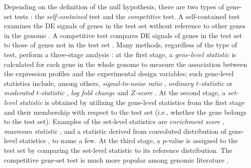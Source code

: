 	Depending on the definition of the null hypothesis, there are two types of gene-set tests
	\citep{goeman2007analyzing}: the \textit{self-contained} test and the \textit{competitive} 
	test. A self-contained test examines the DE signals of genes in the test set without reference 
	to other genes in the genome 	
	\citep{goeman2005testing,goeman2004global,huang2013gene,tsai2009multivariate,wu2010roast}. A 
	competitive test compares DE signals of genes in the test set to those of genes not in the test 
	set \citep{tian2005discovering,wu2012camera,yaari2013quantitative}. Many methods, regardless of 
	the type of test, perform a three-stage analysis
	\citep{khatri2012ten}: at the first stage, a \textit{gene-level statistic} is calculated for 
	each gene in the whole genome to measure the association between the expression profiles and the
	experimental design variables; such gene-level statistics include, among others,
	\textit{signal-to-noise ratio} \citep{subramanian2005gene}, \textit{ordinary $t$-statistic}
	\citep{tian2005discovering} or \textit{moderated $t$-statistic} \citep{Smyth2004moderated},
	\textit{log fold change} \citep{kim2005page} and \textit{$Z$-score} 
	\citep{efron2007correlation}. At
	the second stage, a \textit{set-level statistic} is obtained by utilizing the gene-level 
	statistics
	from the first stage and their membership with respect to the test set (i.e., whether the gene
	belongs to the test set). Examples of the set-level statistics are \textit{enrichment score}
	\citep{subramanian2005gene}, \textit{maxmean statistic} \citep{efron2007testing}, and a 
	statistic derived from convoluted distribution of gene-level statistics 
	\citep{yaari2013quantitative}, to name
	a few. At the third stage, a $p$-value is assigned to the test set by comparing the set-level
	statistic to its reference distribution. The competitive gene-set test is much more popular 
	among genomic literature \citep{gatti2010heading,goeman2007analyzing}.  
	
	
